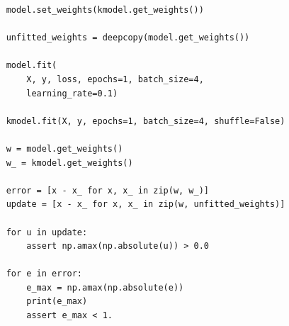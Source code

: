 \documentclass[]{article}
\begin{document}
\begin{appendices}
\begin{lstlisting}
    model.set_weights(kmodel.get_weights())

    unfitted_weights = deepcopy(model.get_weights())

    model.fit(
        X, y, loss, epochs=1, batch_size=4,
        learning_rate=0.1)

    kmodel.fit(X, y, epochs=1, batch_size=4, shuffle=False)

    w = model.get_weights()
    w_ = kmodel.get_weights()

    error = [x - x_ for x, x_ in zip(w, w_)]
    update = [x - x_ for x, x_ in zip(w, unfitted_weights)]

    for u in update:
        assert np.amax(np.absolute(u)) > 0.0

    for e in error:
        e_max = np.amax(np.absolute(e))
        print(e_max)
        assert e_max < 1.
\end{lstlisting}

\end{appendices} %


\clearpage

\printglossary[type=\acronymtype]
\end{document}
